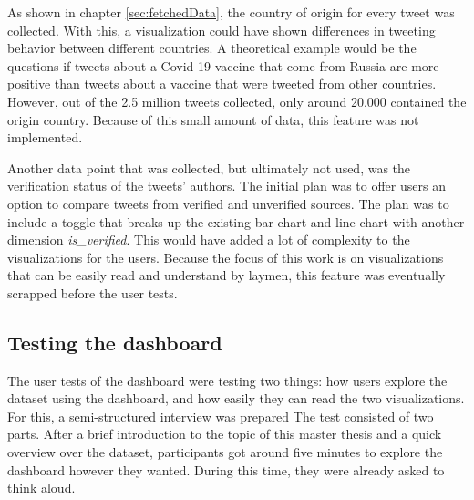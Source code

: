 As shown in chapter \ref{sec:fetchedData}, the country of origin for every tweet was collected. With this, a visualization could have shown differences in tweeting behavior between different countries. A theoretical example would be the questions if tweets about a Covid-19 vaccine that come from Russia are more positive than tweets about a vaccine that were tweeted from other countries. However, out of the 2.5 million tweets collected, only around 20,000 contained the origin country. Because of this small amount of data, this feature was not implemented.

Another data point that was collected, but ultimately not used, was the verification status of the tweets' authors. The initial plan was to offer users an option to compare tweets from verified and unverified sources. The plan was to include a toggle that breaks up the existing bar chart and line chart with another dimension \emph{is\_verified}. This would have added a lot of complexity to the visualizations for the users. Because the focus of this work is on visualizations that can be easily read and understand by laymen, this feature was eventually scrapped before the user tests.

\subsection{Testing the dashboard}
The user tests of the dashboard were testing two things: how users explore the dataset using the dashboard, and how easily they can read the two visualizations. For this, a semi-structured interview was prepared %
The test consisted of two parts. After a brief introduction to the topic of this master thesis and a quick overview over the dataset, participants got around five minutes to explore the dashboard however they wanted. During this time, they were already asked to think aloud.

